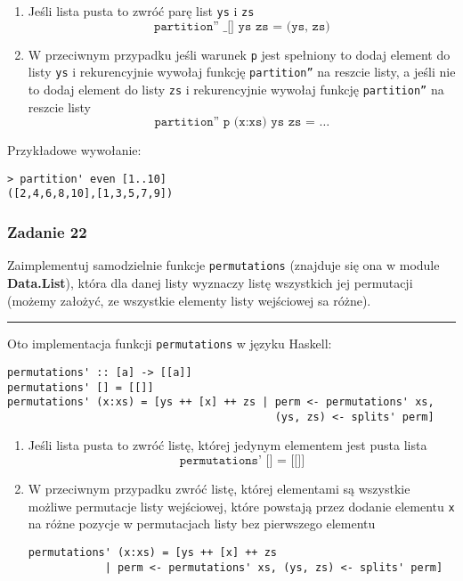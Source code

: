 \documentclass[11pt,a4paper]{article}
\begin{document}
\begin{enumerate}
    \item Jeśli lista pusta to zwróć parę list \texttt{ys} i \texttt{zs}
        \[
            \texttt{partition'' \_ [] ys zs = (ys, zs)}
        \]
    \item W przeciwnym przypadku jeśli warunek \texttt{p} jest spełniony to dodaj element do listy \texttt{ys} i rekurencyjnie wywołaj funkcję \texttt{partition''} na reszcie listy, a jeśli nie to dodaj element do listy \texttt{zs} i rekurencyjnie wywołaj funkcję \texttt{partition''} na reszcie listy
        \[
            \texttt{partition'' p (x:xs) ys zs = \ldots}
        \]
\end{enumerate}
Przykładowe wywołanie:
\begin{Verbatim}[frame=single]
> partition' even [1..10]
([2,4,6,8,10],[1,3,5,7,9])
\end{Verbatim}


\subsubsection{Zadanie 22}
Zaimplementuj samodzielnie funkcje \texttt{permutations} (znajduje się ona w module \textbf{Data.List}), która dla danej listy wyznaczy listę wszystkich jej permutacji (możemy założyć, ze wszystkie elementy listy wejściowej sa różne).

\bigskip
\hrule
\bigskip

Oto implementacja funkcji \texttt{permutations} w języku Haskell:
\begin{Verbatim}[frame=single]
permutations' :: [a] -> [[a]]
permutations' [] = [[]]
permutations' (x:xs) = [ys ++ [x] ++ zs | perm <- permutations' xs,
                                          (ys, zs) <- splits' perm]
\end{Verbatim}

\begin{enumerate}
    \item Jeśli lista pusta to zwróć listę, której jedynym elementem jest pusta lista
        \[
            \texttt{permutations' [] = [[]]}
        \]
    \item W przeciwnym przypadku zwróć listę, której elementami są wszystkie możliwe permutacje listy wejściowej, które powstają przez dodanie elementu \texttt{x} na różne pozycje w permutacjach listy bez pierwszego elementu
        \begin{Verbatim}
permutations' (x:xs) = [ys ++ [x] ++ zs
            | perm <- permutations' xs, (ys, zs) <- splits' perm]
        \end{Verbatim}
\end{enumerate}
\end{document}
